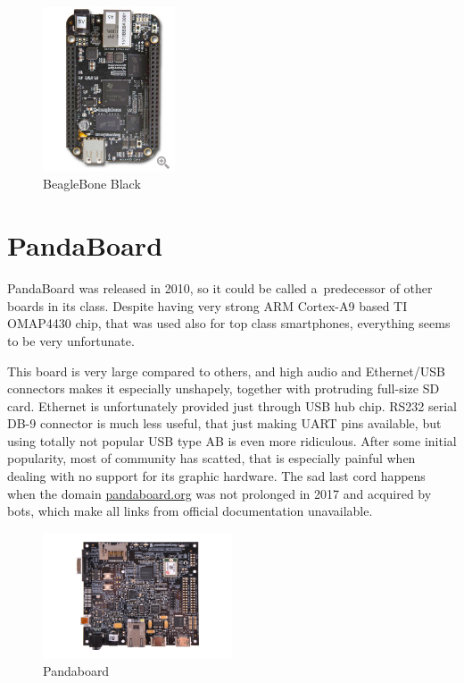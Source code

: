 \documentclass[printmode]{mgr}
\begin{document}
\begin{figure}[htbp]
  \centering
    \includegraphics[width=0.35\textwidth,angle=-90,origin=c]{beaglebone-front.jpg}
  \caption{BeagleBone Black}
  \label{fig:devboard-beaglebone}
\end{figure}

\section{PandaBoard}

PandaBoard was released in 2010, so it could be called a~predecessor of other boards in its class. Despite having very strong ARM Cortex-A9 based TI OMAP4430 chip, that was used also for top class smartphones, everything seems to be very unfortunate.

This board is very large compared to others, and high audio and Ethernet/USB connectors makes it especially unshapely, together with protruding full-size SD card. Ethernet is unfortunately provided just through USB hub chip. RS232 serial DB-9 connector is much less useful, that just making UART pins available, but using totally not popular USB type AB is even more ridiculous. After some initial popularity, most of community has scatted, that is especially painful when dealing with no support for its graphic hardware. The sad last cord happens when the domain \url{pandaboard.org} was not prolonged in 2017 and acquired by bots, which make all links from official documentation unavailable.

\begin{figure}[htbp]
  \centering
    \includegraphics[width=0.5\textwidth]{pandaboard-front.png}
  \caption{Pandaboard}
  \label{fig:devboard-pandaboard}
\end{figure}
\end{document}
